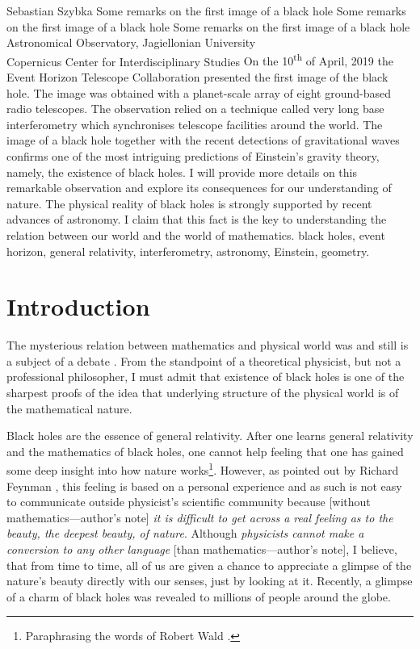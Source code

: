 \begin{artengenv}{Sebastian Szybka}
	{Some remarks on the first image of a black hole}
	{Some remarks on the first image of a black hole}
	{Some remarks on the first image of a black hole}
	{Astronomical Observatory, Jagiellonian University\\
	Copernicus Center for Interdisciplinary Studies}
	{On the 10\textsuperscript{th} of April, 2019 the Event Horizon Telescope Collaboration presented the first image of the black hole. The image was obtained with a planet-scale array of eight ground-based radio telescopes. The observation relied on a technique called very long base interferometry which synchronises telescope facilities around the world. The image of a black hole together with the recent detections of gravitational waves confirms one of the most intriguing predictions of Einstein's gravity theory, namely, the existence of black holes. I will provide more details on this remarkable observation and explore its consequences for our understanding of nature. The physical reality of black holes is strongly supported by recent advances of astronomy. I claim that this fact is the key to understanding the relation between our world and the world of mathematics.}
	{black holes, event horizon, general relativity, interferometry, astronomy, Einstein, geometry.}


\section{Introduction}
\indent \lettrine[loversize=0.13,lines=2,lraise=-0.05,nindent=0em,findent=0.2pt]%
{T}{}he mysterious relation between mathematics and physical world was and still is a subject of a debate \parencite{wigner_unreasonable_1960}. From the standpoint of a theoretical physicist, but not a professional philosopher, I must admit that existence of black holes is one of the sharpest proofs of the idea that underlying structure of the physical world is of the mathematical nature. 

Black holes are the essence of general relativity. After one learns general relativity and the mathematics of black holes, one cannot help feeling that one has gained some deep insight into how nature works\footnote{Paraphrasing the words of Robert Wald \parencite*{wald_general_1984}.}.  However, as pointed out by Richard Feynman \parencite*{feynman_character_1967}, this feeling is based on a personal experience and as such is not easy to communicate outside physicist's scientific community because  [without mathematics---author's note] \textit{it is difficult to get across a real feeling as to the beauty, the deepest beauty, of nature}. Although \textit{physicists cannot make a conversion to any other language} [than mathematics---author's note], I believe, that from time to time, all of us are given a chance to appreciate a glimpse of the nature's beauty directly with our senses, just by looking at it. Recently, a glimpse of a charm of black holes was revealed to millions of people around the globe.


\end{artengenv}
